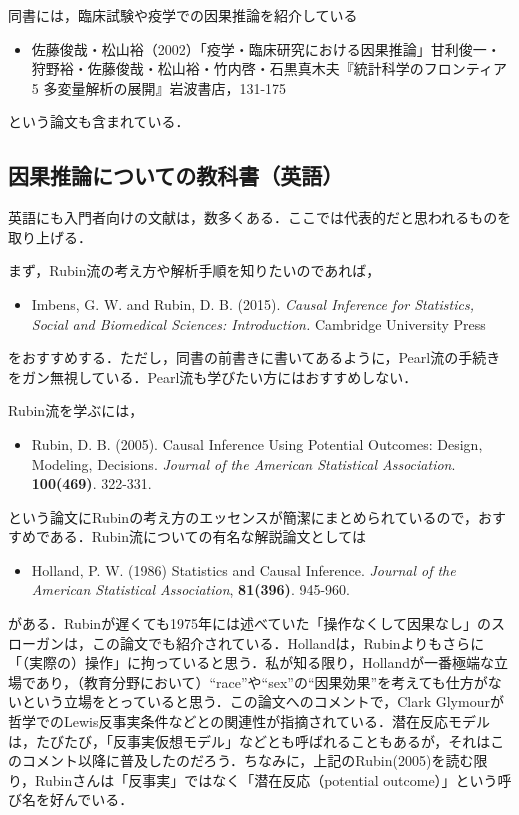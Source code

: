 \documentclass[12pt]{jsarticle}
\begin{document}
同書には，臨床試験や疫学での因果推論を紹介している
\begin{itemize}
\item[] 佐藤俊哉・松山裕（2002）「疫学・臨床研究における因果推論」甘利俊一・狩野裕・佐藤俊哉・松山裕・竹内啓・石黒真木夫『統計科学のフロンティア5 多変量解析の展開』岩波書店，131-175
\end{itemize}
という論文も含まれている．




\subsection{因果推論についての教科書（英語）}

英語にも入門者向けの文献は，数多くある．ここでは代表的だと思われるものを取り上げる．

まず，Rubin流の考え方や解析手順を知りたいのであれば，
\begin{itemize}
\item[] Imbens, G. W. and Rubin, D. B. (2015). {\it Causal Inference for Statistics, Social and Biomedical Sciences: Introduction.} Cambridge University Press
\end{itemize}
をおすすめする．ただし，同書の前書きに書いてあるように，Pearl流の手続きをガン無視している．Pearl流も学びたい方にはおすすめしない．

Rubin流を学ぶには，
\begin{itemize}
\item[] Rubin, D. B. (2005). Causal Inference Using Potential Outcomes: Design, Modeling, Decisions. {\it Journal of the American Statistical Association}. {\bf 100(469)}. 322-331.
\end{itemize}
という論文にRubinの考え方のエッセンスが簡潔にまとめられているので，おすすめである．Rubin流についての有名な解説論文としては
\begin{itemize}
\item[] Holland, P. W. (1986) Statistics and Causal Inference. {\it Journal of the American Statistical Association}, {\bf 81(396)}. 945-960.
\end{itemize}
がある．Rubinが遅くても1975年には述べていた「操作なくして因果なし」のスローガンは，この論文でも紹介されている．Hollandは，Rubinよりもさらに「（実際の）操作」に拘っていると思う．私が知る限り，Hollandが一番極端な立場であり，（教育分野において）``race''や``sex''の``因果効果''を考えても仕方がないという立場をとっていると思う．この論文へのコメントで，Clark Glymourが哲学でのLewis反事実条件などとの関連性が指摘されている．潜在反応モデルは，たびたび，「反事実仮想モデル」などとも呼ばれることもあるが，それはこのコメント以降に普及したのだろう．ちなみに，上記のRubin(2005)を読む限り，Rubinさんは「反事実」ではなく「潜在反応（potential outcome）」という呼び名を好んでいる．
\end{document}
